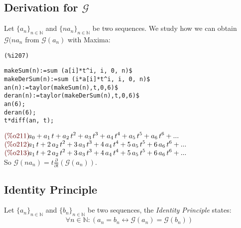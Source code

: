 \subsection{Derivation for $\mathcal{G} $}

Let $\{a_n\}_{n\in\mathbb{N} }$ and $\{n a_{n}\}_{n\in\mathbb{N} } $
be two sequences. We study how we can obtain $\mathcal{G}(n a_{n} $
from $\mathcal{G} (a_n)$ with Maxima:\\
\noindent
\begin{minipage}[t]{8ex}{\color{red}\bf
\begin{verbatim}
(%i207) 
\end{verbatim}}
\end{minipage}
\begin{minipage}[t]{\textwidth}{\color{blue}
\begin{verbatim}
makeSum(n):=sum (a[i]*t^i, i, 0, n)$
makeDerSum(n):=sum (i*a[i]*t^i, i, 0, n)$
an(n):=taylor(makeSum(n),t,0,6)$
deran(n):=taylor(makeDerSum(n),t,0,6)$
an(6);
deran(6);
t*diff(an, t);
\end{verbatim}}
\end{minipage}
\begin{math}\displaystyle
\parbox{8ex}{\color{labelcolor}(\%o211) }
{a}_{0}+{a}_{1}\,t+{a}_{2}\,{t}^{2}+{a}_{3}\,{t}^{3}+{a}_{4}\,{t}^{4}+{a}_{5}\,{t}^{5}+{a}_{6}\,{t}^{6}+...
\end{math}\\
\begin{math}\displaystyle
\parbox{8ex}{\color{labelcolor}(\%o212) }
{a}_{1}\,t+2\,{a}_{2}\,{t}^{2}+3\,{a}_{3}\,{t}^{3}+4\,{a}_{4}\,{t}^{4}+5\,{a}_{5}\,{t}^{5}+6\,{a}_{6}\,{t}^{6}+...
\end{math}\\
\begin{math}\displaystyle
\parbox{8ex}{\color{labelcolor}(\%o213) }
{a}_{1}\,t+2\,{a}_{2}\,{t}^{2}+3\,{a}_{3}\,{t}^{3}+4\,{a}_{4}\,{t}^{4}+5\,{a}_{5}\,{t}^{5}+6\,{a}_{6}\,{t}^{6}+...
\end{math}\\
So $\mathcal{G}(n a_n) = t \frac{\partial}{\partial t}\left(
  \mathcal{G} (a_n) \right) $.

\subsection{Identity Principle}

Let $\{a_n\}_{n\in\mathbb{N} } $ and $\{b_n\}_{n\in\mathbb{N} } $ be
two sequences, the \emph{Identity Principle} states:
\begin{displaymath}
  \forall n \in \mathbb{N}: \left( a_n = b_n \leftrightarrow
    \mathcal{G} (a_n) = \mathcal{G} (b_n)\right)
\end{displaymath}

